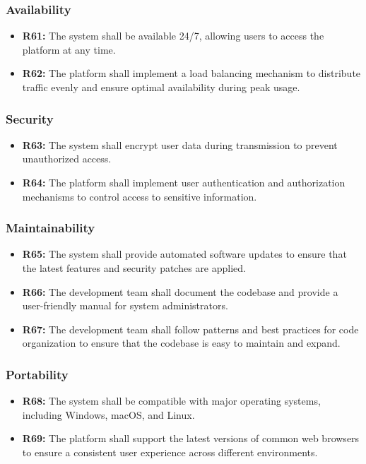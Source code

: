 \documentclass{article}
\begin{document}
\subsubsection{Availability}
\begin{itemize}
  \item \textbf{R61:} The system shall be available 24/7, allowing users to access the platform at any time.
  \item \textbf{R62:} The platform shall implement a load balancing mechanism to distribute traffic evenly and ensure optimal availability during peak usage.
\end{itemize}

\subsubsection{Security}
\begin{itemize}
  \item \textbf{R63:} The system shall encrypt user data during transmission to prevent unauthorized access.
  \item \textbf{R64:} The platform shall implement user authentication and authorization mechanisms to control access to sensitive information.
\end{itemize}

\subsubsection{Maintainability}
\begin{itemize}
  \item \textbf{R65:} The system shall provide automated software updates to ensure that the latest features and security patches are applied.
  \item \textbf{R66:} The development team shall document the codebase and provide a user-friendly manual for system administrators.
  \item \textbf{R67:} The development team shall follow patterns and best practices for code organization to ensure that the codebase is easy to maintain and expand.
\end{itemize}

\subsubsection{Portability}
\begin{itemize}
  \item \textbf{R68:} The system shall be compatible with major operating systems, including Windows, macOS, and Linux.
  \item \textbf{R69:} The platform shall support the latest versions of common web browsers to ensure a consistent user experience across different environments.
\end{itemize}
\end{document}
